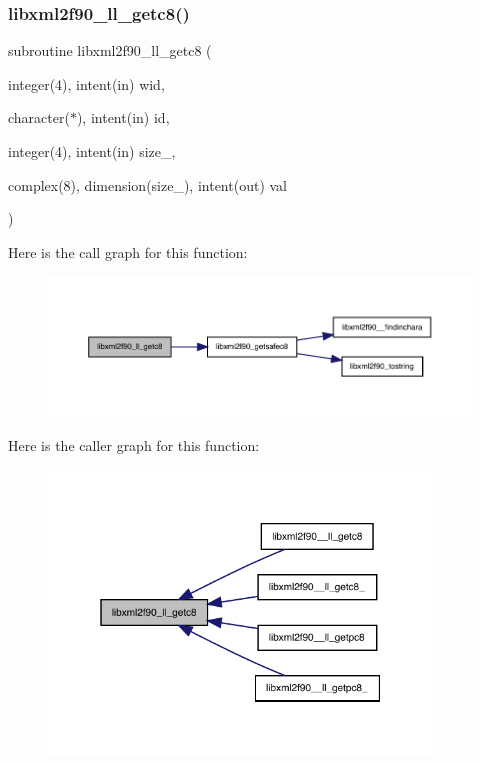\subsubsection{\texorpdfstring{libxml2f90\+\_\+ll\+\_\+getc8()}{libxml2f90\_ll\_getc8()}}
{\footnotesize\ttfamily subroutine libxml2f90\+\_\+ll\+\_\+getc8 (\begin{DoxyParamCaption}\item[{integer(4), intent(in)}]{wid,  }\item[{character($\ast$), intent(in)}]{id,  }\item[{integer(4), intent(in)}]{size\+\_\+,  }\item[{complex(8), dimension(size\+\_\+), intent(out)}]{val }\end{DoxyParamCaption})}

Here is the call graph for this function\+:
\nopagebreak
\begin{figure}[H]
\begin{center}
\leavevmode
\includegraphics[width=350pt]{libxml2f90_8f90__pp_8f90_a6a5ed182d7a75ff001e4372fb131e07c_cgraph}
\end{center}
\end{figure}
Here is the caller graph for this function\+:
\nopagebreak
\begin{figure}[H]
\begin{center}
\leavevmode
\includegraphics[width=289pt]{libxml2f90_8f90__pp_8f90_a6a5ed182d7a75ff001e4372fb131e07c_icgraph}
\end{center}
\end{figure}
\mbox{\label{libxml2f90_8f90__pp_8f90_a4f559755e5ceb6b3e6c845315d74ea7c}} 
